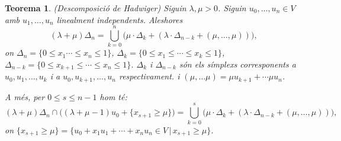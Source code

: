 \documentclass{article}
\newtheorem{teorema}{Teorema}
\theoremstyle{definition}
\begin{document}
\begin{teorema}\label{Teo:Hadwiger}
(Descomposici\'{o} de Hadwiger) Siguin $\lambda,\mu>0$. Siguin $u_0,\ldots,u_n\in V$ amb $u_1,\ldots,u_n$ linealment independents. Aleshores
\[(\lambda+\mu)\Delta_n=\bigcup_{k=0}^n\Big(\mu\cdot\Delta_k+(\lambda\cdot\Delta_{n-k}+(\mu,\ldots,\mu))\Big),\]
on $\Delta_n=\{0\leq x_1\cdots\leq x_n\leq1\}$, $\Delta_k=\{0\leq x_1\leq\cdots\leq x_k\leq1\}$, $\Delta_{n-k}=\{0\leq x_{k+1}\leq\cdots\leq x_n\leq1\}$. $\Delta_k$ i $\Delta_{n-k}$ s\'{o}n els s\'{i}mplexs corresponents a $u_0,u_1,\ldots,u_k$ i a $u_0,u_{k+1},\ldots,u_n$ respectivament. i $(\mu,\ldots\mu)=\mu u_{k+1}+\cdots\mu u_n$.

A m\'{e}s, per $0\leq s\leq n-1$ hom t\'{e}:
\[(\lambda+\mu)\Delta_n\cap\big((\lambda+\mu-1)u_0+\{x_{s+1}\geq\mu\}\big)=\bigcup_{k=0}^s\Big(\mu\cdot\Delta_k+(\lambda\cdot\Delta_{n-k}+(\mu,\ldots,\mu))\Big),\]
on $\{x_{s+1}\geq\mu\}=\{u_0+x_1u_1+\cdots+x_nu_n\in V\,|\,x_{s+1}\geq\mu\}$.
\end{teorema}
\end{document}
